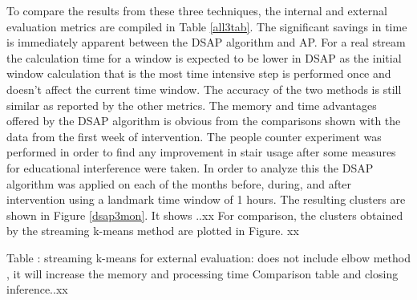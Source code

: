 To compare the results from these three techniques, the internal and external evaluation metrics are compiled in Table \ref{all3tab}. The significant savings in time is immediately apparent between the DSAP algorithm and AP. For a real stream the calculation time for a window is expected to be lower in DSAP as the initial window calculation that is the most time intensive step is performed once and doesn't affect the current time window. The accuracy of the two methods is still similar as reported by the other metrics. 
The memory and time advantages offered by the DSAP algorithm is obvious from the comparisons shown with the data from the first week of intervention. The people counter experiment was performed in order to find any improvement in stair usage after some measures for educational interference were taken. In order to analyze this the DSAP algorithm was applied on each of the months before, during, and after intervention using a landmark time window of 1 hours. The resulting clusters are shown in Figure \ref{dsap3mon}. It shows ..xx
For comparison, the clusters obtained by the streaming k-means method are plotted in Figure. xx


Table : streaming k-means for external evaluation: does not include elbow method , it will increase the memory and processing time  
Comparison table and closing inference..xx



